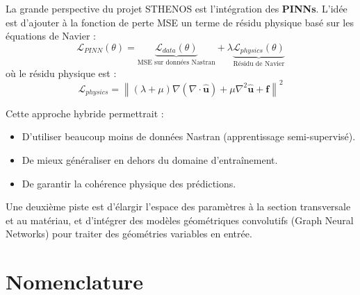 \documentclass[journal, a4paper, twocolumn]{IEEEtran}
\begin{document}
La grande perspective du projet STHENOS est l'intégration des \textbf{PINNs}. L'idée est d'ajouter à la fonction de perte MSE un terme de résidu physique basé sur les équations de Navier :
\begin{equation}
    \mathcal{L}_{PINN}(\theta) = \underbrace{\mathcal{L}_{data}(\theta)}_{\text{MSE sur données Nastran}} + \lambda \underbrace{\mathcal{L}_{physics}(\theta)}_{\text{Résidu de Navier}}
\end{equation}
où le résidu physique est :
\begin{equation}
    \mathcal{L}_{physics} = \left\| (\lambda+\mu)\nabla(\nabla\cdot\hat{\bm{u}}) + \mu\nabla^2\hat{\bm{u}} + \bm{f} \right\|^2
\end{equation}

Cette approche hybride permettrait :
\begin{itemize}
    \item D'utiliser beaucoup moins de données Nastran (apprentissage semi-supervisé).
    \item De mieux généraliser en dehors du domaine d'entraînement.
    \item De garantir la cohérence physique des prédictions.
\end{itemize}

Une deuxième piste est d'élargir l'espace des paramètres à la section transversale et au matériau, et d'intégrer des modèles géométriques convolutifs (Graph Neural Networks) pour traiter des géométries variables en entrée.



\section{Nomenclature}
\end{document}
